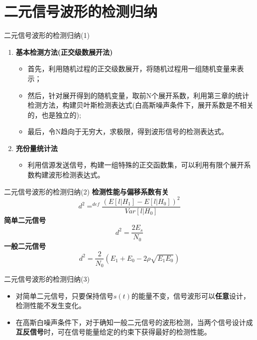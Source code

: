 \section{二元信号波形的检测归纳}

\begin{frame}{二元信号波形的检测归纳(1)}
\begin{enumerate}
	\setlength{\itemsep}{.5cm}
	\item \textbf{基本检测方法(正交级数展开法)}
	\begin{itemize}
		\item 首先，利用随机过程的正交级数展开，将随机过程用一组随机变量来表示；
		\item 然后，针对展开得到的随机变量，取前N个展开系数，利用第三章的统计检测方法，构建贝叶斯检测表达式(白高斯噪声条件下，展开系数是不相关的，也是独立的);
		\item 最后，令N趋向于无穷大，求极限，得到波形信号的检测表达式。	
	\end{itemize}
    \item \textbf{充份量统计法}
    \begin{itemize}
    	\item 利用信源发送信号，构建一组特殊的正交函数集，可以利用有限个展开系数构建波形检测表达式。
    \end{itemize}	
\end{enumerate}
\end{frame}

\begin{frame}{二元信号波形的检测归纳(2)}
\textbf{检测性能与偏移系数有关}
\[
d^2\mathop{=}^{def}\frac{\left(E[l|H_1]-E[l|H_0]\right)^2}{Var[l|H_0]}
\]
\textbf{简单二元信号}
\[d^2=\frac{2E_s}{N_0}\]
\textbf{一般二元信号}
\[d^2=\frac{2}{N_0}\left(E_1+E_0-2\rho\sqrt{E_1E_0}\right) \]
\end{frame}

\begin{frame}{二元信号波形的检测归纳(3)}
\begin{itemize}
	\setlength{\itemsep}{.5cm}
	\item 对简单二元信号，只要保持信号$s(t)$的能量不变，信号波形可以\textbf{任意}设计，检测性能不发生变化。
	\item 在高斯白噪声条件下，对于确知一般二元信号的波形检测，当两个信号设计成\textbf{互反信号}时，可在信号能量给定的约束下获得最好的检测性能。	
\end{itemize}
\end{frame}

